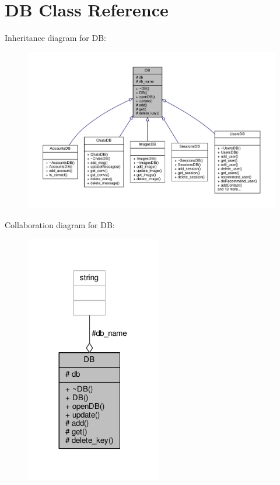 \hypertarget{classDB}{}\section{DB Class Reference}
\label{classDB}


Inheritance diagram for DB\+:\nopagebreak
\begin{figure}[H]
\begin{center}
\leavevmode
\includegraphics[width=350pt]{d3/dc0/classDB__inherit__graph}
\end{center}
\end{figure}


Collaboration diagram for DB\+:\nopagebreak
\begin{figure}[H]
\begin{center}
\leavevmode
\includegraphics[width=168pt]{d7/d82/classDB__coll__graph}
\end{center}
\end{figure}
